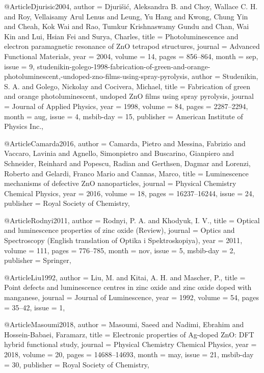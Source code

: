 @Article{Djurisic2004,
  author  = {Djurišić, Aleksandra B. and Choy, Wallace C. H. and Roy, Vellaisamy Arul Lenus and Leung, Yu Hang and Kwong, Chung Yin and Cheah, Kok Wai and Rao, Tumkur Krishnaswamy Gundu and Chan, Wai Kin and Lui, Hsian Fei and Surya, Charles},
  title   = {Photoluminescence and electron paramagnetic resonance of ZnO tetrapod structures},
  journal = {Advanced Functional Materials},
  year    = {2004},
  volume  = {14},
  pages   = {856--864},
  month   = sep,
  issue   = {9},
}
{studenikin-golego-1998-fabrication-of-green-and-orange-photoluminescent,-undoped-zno-films-using-spray-pyrolysis,
  author    = {Studenikin, S. A. and Golego, Nickolay and Cocivera, Michael},
  title     = {Fabrication of green and orange photoluminescent, undoped ZnO films using spray pyrolysis},
  journal   = {Journal of Applied Physics},
  year      = {1998},
  volume    = {84},
  pages     = {2287--2294},
  month     = aug,
  issue     = {4},
  msbib-day = {15},
  publisher = {American Institute of Physics Inc.},
}

@Article{Camarda2016,
  author    = {Camarda, Pietro and Messina, Fabrizio and Vaccaro, Lavinia and Agnello, Simonpietro and Buscarino, Gianpiero and Schneider, Reinhard and Popescu, Radian and Gerthsen, Dagmar and Lorenzi, Roberto and Gelardi, Franco Mario and Cannas, Marco},
  title     = {Luminescence mechanisms of defective ZnO nanoparticles},
  journal   = {Physical Chemistry Chemical Physics},
  year      = {2016},
  volume    = {18},
  pages     = {16237--16244},
  issue     = {24},
  publisher = {Royal Society of Chemistry},
}

@Article{Rodnyi2011,
  author    = {Rodnyi, P. A. and Khodyuk, I. V.},
  title     = {Optical and luminescence properties of zinc oxide (Review)},
  journal   = {Optics and Spectroscopy (English translation of Optika i Spektroskopiya)},
  year      = {2011},
  volume    = {111},
  pages     = {776--785},
  month     = nov,
  issue     = {5},
  msbib-day = {2},
  publisher = {Springer},
}

@Article{Liu1992,
  author  = {Liu, M. and Kitai, A. H. and Mascher, P.},
  title   = {Point defects and luminescence centres in zinc oxide and zinc oxide doped with manganese},
  journal = {Journal of Luminescence},
  year    = {1992},
  volume  = {54},
  pages   = {35--42},
  issue   = {1},
}

@Article{Masoumi2018,
  author    = {Masoumi, Saeed and Nadimi, Ebrahim and Hossein-Babaei, Faramarz},
  title     = {Electronic properties of Ag-doped ZnO: DFT hybrid functional study},
  journal   = {Physical Chemistry Chemical Physics},
  year      = {2018},
  volume    = {20},
  pages     = {14688--14693},
  month     = may,
  issue     = {21},
  msbib-day = {30},
  publisher = {Royal Society of Chemistry},
}

